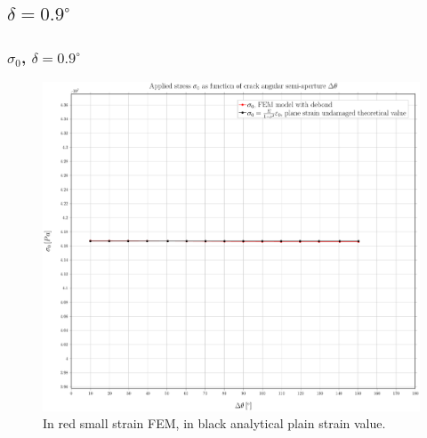 \documentclass[first,firstsupp,lastsupp,handout,last,hyperref,table]{ETHclass}
\begin{document}


\subsection{$\delta=0.9^{\circ}$}

\begin{frame}
\frametitle{\small $\sigma_{0}$, $\delta=0.9^{\circ}$}
\vspace{-0.5cm}
\centering
\captionsetup[figure]{font=scriptsize,labelfont=scriptsize}
\begin{figure}[!h]
\centering
\includegraphics[height=0.7\textheight]{2017-07-10_AbqRunSummary_SmallStrainD09_sigma-inf_Summary.pdf}
  \caption{\scriptsize In red small strain FEM, in black analytical plain strain value.}
  \label{fig:res1}
\end{figure}
\end{frame}
\end{document}
